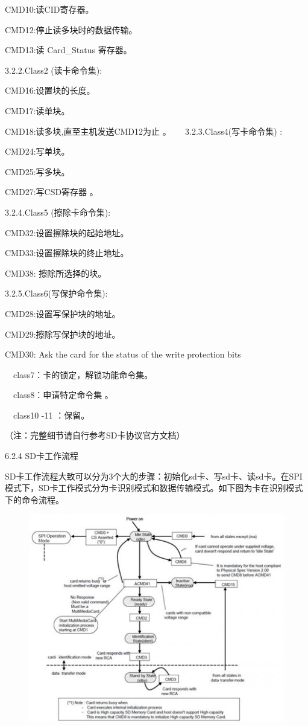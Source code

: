 CMD10:读CID寄存器。

CMD12:停止读多块时的数据传输。

CMD13:读 Card_Status 寄存器。

3.2.2.Class2 (读卡命令集):

CMD16:设置块的长度。

CMD17:读单块。

CMD18:读多块,直至主机发送CMD12为止 。
　
3.2.3.Class4(写卡命令集) :

CMD24:写单块。

CMD25:写多块。

CMD27:写CSD寄存器 。

3.2.4.Class5 (擦除卡命令集):

CMD32:设置擦除块的起始地址。

CMD33:设置擦除块的终止地址。

CMD38: 擦除所选择的块。


3.2.5.Class6(写保护命令集):

CMD28:设置写保护块的地址。

CMD29:擦除写保护块的地址。

CMD30: Ask the card for the status of the write protection bits

　class7：卡的锁定，解锁功能命令集。

　class8：申请特定命令集 。

　class10 -11 ：保留。

（注：完整细节请自行参考SD卡协议官方文档）

6.2.4 SD卡工作流程

SD卡工作流程大致可以分为3个大的步骤：初始化sd卡、写sd卡、读sd卡。在SPI模式下，SD卡⼯作模式分为卡识别模式和数据传输模式。如下图为卡在识别模式下的命令流程。

\begin{figure}[H]
    \centering
    \includegraphics{figures/06-02-命令流程.png}
\end{figure}

